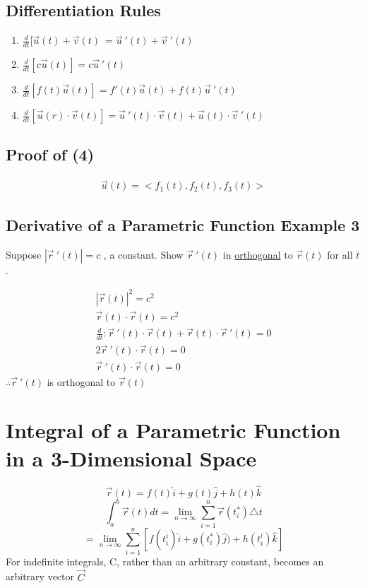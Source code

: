 \documentclass[12pt]{article}
\begin{document}
\subsection{Differentiation Rules}
\begin{enumerate}
	\item \(\frac{d}{dt}[\vec{u} (t)  +\vec{v} (t)\ = \vec{u} \ '(t) + \vec{v}\ '(t)   \) 
	\item \(\frac{d}{dt}[c \vec{u} (t)] = c \vec{u} \ '(t)  \) 
	\item \(\frac{d}{dt}[f(t) \vec{u}(t)] = f'(t)\vec{u} (t) + f(t)\vec{u} \ '(t)    \) 
	\item \(\frac{d}{dt}[\vec{u} (r)\cdot \vec{v} (t)] = \vec{u} \ '(t)\cdot \vec{v} (t)+ \vec{u} (t) \cdot \vec{v} \ '(t)       \) 
\end{enumerate}

\subsection{Proof of (4)}
\begin{align}
	\vec{u} (t)	= <f_1(t),f_2(t),f_3(t)> 
\end{align}
\subsection{Derivative of a Parametric Function Example 3}
Suppose \(|\vec{r} \ '(t)| = c\) , a constant. Show \(\vec{r} \ '(t) \) in \underline{orthogonal} to \(\vec{r} (t) \) for all \(t\).

\begin{align}
	|\vec{r} (t)|^2 = c^2\\%
	\vec{r} (t)	\cdot \vec{r} (t) = c^2\\%
	\frac{d}{dt}: \vec{r} \ '(t) \cdot \vec{r} (t) + \vec{r} (t) \cdot \vec{r} \ '(t) = 0 \\%
	2 \vec{r} \ '(t) \cdot \vec{r} (t) = 0\\%
	\vec{r} \ '(t) \cdot \vec{r} (t) = 0
\end{align}
\(\therefore \vec{r} \ '(t) \) is orthogonal to \(\vec{r} (t) \) 

\section{Integral of a Parametric Function in a 3-Dimensional Space}
\[
	\vec{r} (t) = f(t)\hat{i} + g(t) \hat{j} + h(t) \hat{k}
\]
\[
	\int_{a}^{b} \vec{r} (t)dt = \lim_{n \to \infty} \sum_{i=1}^{n} \vec{r} (t^*_i)\triangle t
\]
\[
	=\lim_{n \to \infty} \sum_{i=1}^{n} [f(t^{\hat{i}}_i)\hat{i}+g(t^*_i)\hat{j}) + h(t^l_i)\hat{k}] %
\]
For indefinite integrals, C, rather than an arbitrary constant, becomes an arbitrary vector \(\vec{C}  \) 
\end{document}
